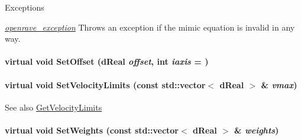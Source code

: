 \begin{DoxyExceptions}{Exceptions}
\item[{\em \hyperlink{classOpenRAVE_1_1openrave__exception}{openrave\_\-exception}}]Throws an exception if the mimic equation is invalid in any way. \end{DoxyExceptions}
\hypertarget{classOpenRAVE_1_1KinBody_1_1Joint_ad33ede63ec196d7af2a3d5ea4e2e5c60}{
\paragraph[{SetOffset}]{\setlength{\rightskip}{0pt plus 5cm}virtual void SetOffset (dReal {\em offset}, \/  int {\em iaxis} = {})}\hfill}
\label{classOpenRAVE_1_1KinBody_1_1Joint_ad33ede63ec196d7af2a3d5ea4e2e5c60}
\hypertarget{classOpenRAVE_1_1KinBody_1_1Joint_a9792a14881ff4bbcc058415fce2100d5}{
\paragraph[{SetVelocityLimits}]{\setlength{\rightskip}{0pt plus 5cm}virtual void SetVelocityLimits (const std::vector$<$ dReal $>$ \& {\em vmax})}\hfill}
\label{classOpenRAVE_1_1KinBody_1_1Joint_a9792a14881ff4bbcc058415fce2100d5}
\begin{DoxySeeAlso}{See also}
\hyperlink{classOpenRAVE_1_1KinBody_1_1Joint_acb05f676c90a3c2f07586b09e8ff07c4}{GetVelocityLimits} 
\end{DoxySeeAlso}
\hypertarget{classOpenRAVE_1_1KinBody_1_1Joint_a7b884c5900625a5d49951afaf67fcc27}{
\paragraph[{SetWeights}]{\setlength{\rightskip}{0pt plus 5cm}virtual void SetWeights (const std::vector$<$ dReal $>$ \& {\em weights})}\hfill}
